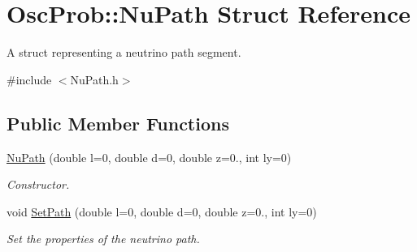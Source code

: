 \hypertarget{structOscProb_1_1NuPath}{}\section{Osc\+Prob\+:\+:Nu\+Path Struct Reference}
\label{structOscProb_1_1NuPath}


A struct representing a neutrino path segment.  




{\ttfamily \#include $<$Nu\+Path.\+h$>$}

\subsection*{Public Member Functions}
\begin{DoxyCompactItemize}
\item 
\hyperlink{structOscProb_1_1NuPath_a1cc885eb24b3152596ac2f8500f81ae6}{Nu\+Path} (double l=0, double d=0, double z=0., int ly=0)
\begin{DoxyCompactList}\small\item\em Constructor. \end{DoxyCompactList}\item 
void \hyperlink{structOscProb_1_1NuPath_afdaab5e2e2c5f1f2c5a2604db80bedf7}{Set\+Path} (double l=0, double d=0, double z=0., int ly=0)
\begin{DoxyCompactList}\small\item\em Set the properties of the neutrino path. \end{DoxyCompactList}\end{DoxyCompactItemize}
